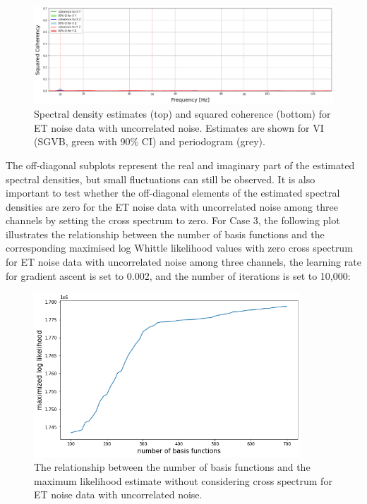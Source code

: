 \documentclass[%
 reprint,
 amsmath,amssymb,
 aps,
]{revtex4-2}
\begin{document}
\begin{figure}
\centering
  \includegraphics[width=15cm]{ET uncorr noise coh.png}
  \caption{Spectral density estimates (top) and squared coherence (bottom) for ET noise data with uncorrelated noise. Estimates are shown for VI (SGVB, green with 90\% CI) and periodogram (grey).}
\end{figure}

The off-diagonal subplots represent the real and imaginary part of the estimated spectral densities, but small fluctuations can still be observed. It is also important to test whether the off-diagonal elements of the estimated spectral densities are zero for the ET noise data with uncorrelated noise among three channels by setting the cross spectrum to zero.
For Case 3, the following plot illustrates the relationship between the number of basis functions and the corresponding maximised log Whittle likelihood values with zero cross spectrum for ET noise data with uncorrelated noise among three channels, the learning rate for gradient ascent is set to 0.002, and the number of iterations is set to 10,000:
\begin{figure}
\centering
  \includegraphics[width=10cm]{num basis funs vs mls ET uncorr no cross.png}
  \caption{The relationship between the number of basis functions and the maximum likelihood estimate without considering cross spectrum for ET noise data with uncorrelated noise.}
  \label{et_uncorr_no_cross_basis_funs_vs_mle}
\end{figure}
\end{document}
